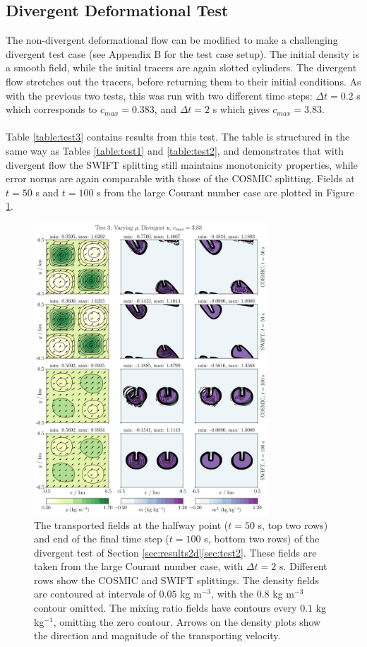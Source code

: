 \documentclass{ametsocV6.1}
\begin{document}
\subsection{Divergent Deformational Test} \label{sec:test3}

The non-divergent deformational flow can be modified to make a challenging divergent test case (see Appendix B for the test case setup). The initial density is a smooth field, while the initial tracers are again slotted cylinders. The divergent flow stretches out the tracers, before returning them to their initial conditions.
As with the previous two tests, this was run with two different time steps: $\Delta t=0.2$ s which corresponds to $c_{max}=0.383$, and $\Delta t=2$ s which gives $c_{max}=3.83$. \\
\\
Table \ref{table:test3} contains results from this test.
The table is structured in the same way as Tables \ref{table:test1} and \ref{table:test2}, and demonstrates that with divergent flow the SWIFT splitting still maintains monotonicity properties, while error norms are again comparable with those of the COSMIC splitting.
Fields at $t=50$ s and $t=100$ s from the large Courant number case are plotted in Figure \ref{fig:test3}. \\
\begin{figure}[ht!]
\centering
\includegraphics[width=0.78\textwidth]{fig_5_divergent.jpg}
\caption{The transported fields at the halfway point ($t=50$ s, top two rows) and end of the final time step ($t=100$ s, bottom two rows) of the divergent test of Section \ref{sec:results2d}\ref{sec:test2}. These fields are taken from the large Courant number case, with $\Delta t=2$ s. Different rows show the COSMIC and SWIFT splittings.
The density fields are contoured at intervals of $0.05$ kg m$^{-3}$, with the $0.8$ kg m$^{-3}$ contour omitted.
The mixing ratio fields have contours every $0.1$ kg kg$^{-1}$, omitting the zero contour.
Arrows on the density plots show the direction and magnitude of the transporting velocity.}\label{fig:test3}
\end{figure} \\
\end{document}
